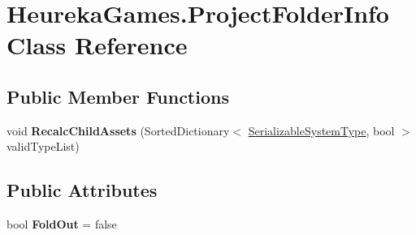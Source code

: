 \hypertarget{class_heureka_games_1_1_project_folder_info}{}\section{Heureka\+Games.\+Project\+Folder\+Info Class Reference}
\label{class_heureka_games_1_1_project_folder_info}
\subsection*{Public Member Functions}
\begin{DoxyCompactItemize}
\item 
\mbox{\label{class_heureka_games_1_1_project_folder_info_a885bee75acde74004dfa9a6fa4b119d5}} 
void {\bfseries Recalc\+Child\+Assets} (Sorted\+Dictionary$<$ \hyperlink{class_heureka_games_1_1_serializable_system_type}{Serializable\+System\+Type}, bool $>$ valid\+Type\+List)
\end{DoxyCompactItemize}
\subsection*{Public Attributes}
\begin{DoxyCompactItemize}
\item 
\mbox{\label{class_heureka_games_1_1_project_folder_info_aaa232a4cb54009323313517ff2cc5565}} 
bool {\bfseries Fold\+Out} = false
\end{DoxyCompactItemize}
